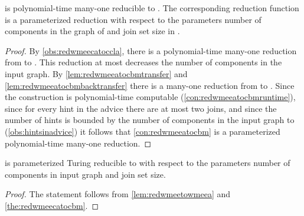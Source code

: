 \begin{theorem}\label{the:redwmeecatocbm}
  \pWMEECA{} is polynomial-time many-one reducible to \pCBM . The corresponding reduction function is a parameterized reduction with respect to the parameters number of components in the graph of \pWMEECAs{} and join set size in \pCBMs{}.
\end{theorem}
\begin{proof}
  By \autoref{obs:redwmeecatoccla}, there is a polynomial-time many-one reduction from \pWMEECAs{} to \pWMEECCLAs{}. This reduction at most decreases the number of components in the input graph. By \autoref{lem:redwmeeatocbmtransfer} and \autoref{lem:redwmeeatocbmbacktransfer} there is a many-one reduction from \pWMEECCLAs{} to \CBMs{} . Since the construction is polynomial-time computable (\autoref{con:redwmeeatocbmruntime}), since for every hint in the advice there are at most two joins, and since the number of hints is bounded by the number of components in the input graph to \pWMEECAs{} (\autoref{obs:hintsinadvice}) it follows that \autoref{con:redwmeeatocbm} is a parameterized polynomial-time many-one reduction.
\end{proof}
\begin{corollary}
  \pWMEE{} is parameterized Turing reducible to \pCBM{} with respect to the parameters number of components in input graph and join set size.
\end{corollary}
\begin{proof}
  The statement follows from \autoref{lem:redwmeetowmeea} and \autoref{the:redwmeecatocbm}.
\end{proof}

